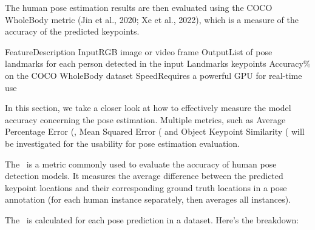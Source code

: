 The human pose estimation results are then evaluated using the COCO WholeBody metric (\scc Jin et al., 2020; \scc Xe et al., 2022), which is a measure of the accuracy of the predicted keypoints.

    \setupTABLE[r][1][style=bold]
    \setupTABLE[c][each][offset=3dd]
    \setupTABLE[frame=off]
    \setupTABLE[r][1][topframe=on,bottomframe=on]
    \setupTABLE[c][each][leftframe=on]
    \setupTABLE[c][1][leftframe=off]
    \bTR
        \bTD Feature\eTD\bTD    Description\eTD\eTR
    \bTR
        \bTD Input\eTD\bTD      RGB image or video frame\eTD\eTR
    \bTR
        \bTD Output\eTD\bTD     List of pose landmarks for each person detected in the input\eTD\eTR
    \bTR
        \bTD Landmarks\eTD{} keypoints\eTD\eTR
    \bTR
        \bTD Accuracy\eTD{}\% on the COCO WholeBody dataset\eTD\eTR
    \bTR
        \bTD Speed\eTD\bTD      Requires a powerful GPU for real-time use\eTD\eTR


In this section, we take a closer look at how to effectively measure the model accuracy concerning the pose estimation. Multiple metrics, such as Average Percentage Error (\APE\), Mean Squared Error (\MSE\) and Object Keypoint Similarity (\OKS\) will be investigated for the usability for pose estimation evaluation.

The \APE\ is a metric commonly used to evaluate the accuracy of human pose detection models. It measures the average difference between the predicted keypoint locations and their corresponding ground truth locations in a pose annotation (for each human instance separately, then averages all instances).

The \APE\ is calculated for each pose prediction in a dataset. Here's the breakdown:

